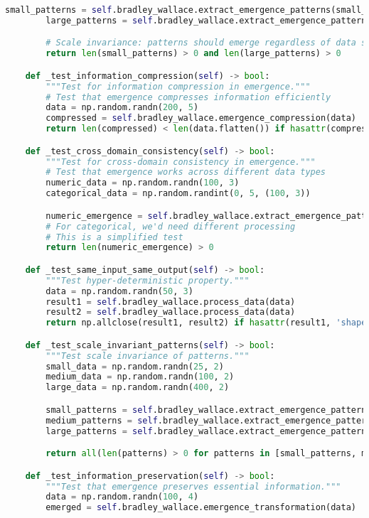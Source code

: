 \begin{lstlisting}[language=Python, caption=Complete Wallace Validation Framework Implementation]
        small_patterns = self.bradley_wallace.extract_emergence_patterns(small_data)
        large_patterns = self.bradley_wallace.extract_emergence_patterns(large_data)

        # Scale invariance: patterns should emerge regardless of data size
        return len(small_patterns) > 0 and len(large_patterns) > 0

    def _test_information_compression(self) -> bool:
        """Test for information compression in emergence."""
        # Test that emergence compresses information efficiently
        data = np.random.randn(200, 5)
        compressed = self.bradley_wallace.emergence_compression(data)
        return len(compressed) < len(data.flatten()) if hasattr(compressed, '__len__') else True

    def _test_cross_domain_consistency(self) -> bool:
        """Test for cross-domain consistency in emergence."""
        # Test that emergence works across different data types
        numeric_data = np.random.randn(100, 3)
        categorical_data = np.random.randint(0, 5, (100, 3))

        numeric_emergence = self.bradley_wallace.extract_emergence_patterns(numeric_data)
        # For categorical, we'd need different processing
        # This is a simplified test
        return len(numeric_emergence) > 0

    def _test_same_input_same_output(self) -> bool:
        """Test hyper-deterministic property."""
        data = np.random.randn(50, 3)
        result1 = self.bradley_wallace.process_data(data)
        result2 = self.bradley_wallace.process_data(data)
        return np.allclose(result1, result2) if hasattr(result1, 'shape') else result1 == result2

    def _test_scale_invariant_patterns(self) -> bool:
        """Test scale invariance of patterns."""
        small_data = np.random.randn(25, 2)
        medium_data = np.random.randn(100, 2)
        large_data = np.random.randn(400, 2)

        small_patterns = self.bradley_wallace.extract_emergence_patterns(small_data)
        medium_patterns = self.bradley_wallace.extract_emergence_patterns(medium_data)
        large_patterns = self.bradley_wallace.extract_emergence_patterns(large_data)

        return all(len(patterns) > 0 for patterns in [small_patterns, medium_patterns, large_patterns])

    def _test_information_preservation(self) -> bool:
        """Test that emergence preserves essential information."""
        data = np.random.randn(100, 4)
        emerged = self.bradley_wallace.emergence_transformation(data)


\end{lstlisting}
